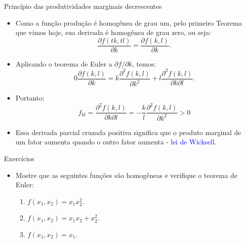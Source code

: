 \documentclass[10pt]{beamer}
\begin{document}
\begin{frame}{Princípio das produtividades marginais decrescentes}
    \begin{itemize}
        \item Como a função produção é homogênea de grau um, pelo primeiro Teorema que vimos hoje, sua derivada é homogênea de grau zero, ou seja:
        \[
        \frac{\partial f(tk, tl)}{\partial k} = \frac{\partial f(k,l)}{\partial k}.
        \]
         
        \item Aplicando o teorema de Euler a $\partial f/\partial k$, temos:
        \[
        0 \frac{\partial f(k,l)}{\partial k} = k \frac{\partial^2 f(k,l)}{\partial k^2} + l \frac{\partial^2 f(k,l)}{\partial k \partial l}.
        \]
         
        \item Portanto:
        \[
        f_{kl} = \frac{\partial^2 f(k,l)}{\partial k \partial l} = -\frac{k}{l}\frac{\partial^2 f(k,l)}{\partial k^2} > 0
        \]
         
        \item Essa derivada parcial cruzada positiva significa que o produto marginal de um fator aumenta quando o outro fator aumenta - \textcolor{blue}{lei de Wicksell}.
    \end{itemize}
\end{frame}

\begin{frame}{Exercícios}
    \begin{itemize}
        \item Mostre que as seguintes funções são homogêneas e verifique o teorema de Euler:     \bigskip
        \begin{enumerate}
            \item $f(x_1, x_2) = x_1x_2^2$.     \bigskip
            \item $f(x_1,x_2) = x_1x_2 + x_2^2$.     \bigskip
            \item $f(x_1,x_2) = x_1$.
        \end{enumerate}
    \end{itemize}
\end{frame}
\end{document}

